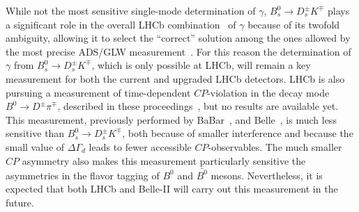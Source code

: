 While not the most sensitive single-mode determination of $\gamma$, $B^0_s \to D^\pm_s K^\mp$ plays a significant
role in the overall LHCb combination~\cite{LHCb-PAPER-2016-032} of $\gamma$ because of its twofold ambiguity, allowing it to select the ``correct''
solution among the ones allowed by the most precise ADS/GLW measurement~\cite{LHCb-PAPER-2016-003}. For this reason the determination
of $\gamma$ from $B^0_s \to D^\pm_s K^\mp$, which is only possible at LHCb, will remain a key measurement for both the current
and upgraded LHCb detectors. LHCb is also pursuing a measurement of time-dependent $CP$-violation in
the decay mode $B^0 \to D^\pm \pi^\mp$, described in these proceedings~\cite{BDPIPROC}, but no results are available yet.
This measurement, previously performed by BaBar~\cite{Aubert:2005yf}, \cite{Aubert:2006tw} and Belle~\cite{Bahinipati:2011yq}, \cite{Ronga:2006hv}
is much less sensitive than $B^0_s \to D^\pm_s K^\mp$, both because of smaller interference and because
the small value of $\Delta\Gamma_d$ leads to fewer accessible $CP$-observables. The much smaller $CP$ asymmetry
also makes this measurement particularly sensitive the asymmetries in the flavor tagging of $B^0$ and $\bar{B^0}$ mesons.
Nevertheless, it is expected that both LHCb and Belle-II will carry out this measurement in the future.
